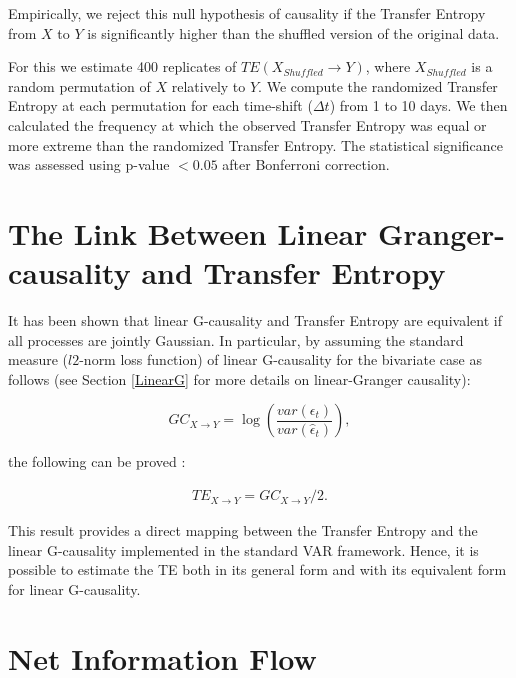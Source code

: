 \documentclass[]{book}
\theoremstyle{definition}
\theoremstyle{definition}
\theoremstyle{definition}
\theoremstyle{remark}
\begin{document}
Empirically, we reject this null hypothesis of causality if the Transfer
Entropy from \(X\) to \(Y\) is significantly higher than the shuffled
version of the original data.

For this we estimate 400 replicates of
\(TE(X_{Shuffled} \rightarrow Y)\), where \(X_{Shuffled}\) is a random
permutation of \(X\) relatively to \(Y\). We compute the randomized
Transfer Entropy at each permutation for each time-shift (\(\Delta t\))
from 1 to 10 days. We then calculated the frequency at which the
observed Transfer Entropy was equal or more extreme than the randomized
Transfer Entropy. The statistical significance was assessed using
p-value \(< 0.05\) after Bonferroni correction.

\section{The Link Between Linear Granger-causality and Transfer
Entropy}\label{the-link-between-linear-granger-causality-and-transfer-entropy}

It has been shown \citep{PhysRevLett.103.238701} that linear G-causality
and Transfer Entropy are equivalent if all processes are jointly
Gaussian. In particular, by assuming the standard measure (\(l2\)-norm
loss function) of linear G-causality for the bivariate case as follows
(see Section \ref{LinearG} for more details on linear-Granger
causality):

\begin{equation}
GC_{X \rightarrow Y} = \log\left( \frac{var(\epsilon_t)}{var( \widehat{\epsilon}_t)} \right),
\label{eq:GCGC}
\end{equation}

the following can be proved \citep{PhysRevLett.103.238701}:

\begin{align}
TE_{X \rightarrow Y} = GC_{X \rightarrow Y}/2.
\label{eq:GCGC2}
\end{align}

This result provides a direct mapping between the Transfer Entropy and
the linear G-causality implemented in the standard VAR framework. Hence,
it is possible to estimate the TE both in its general form and with its
equivalent form for linear G-causality.

\section{Net Information Flow}\label{net-information-flow}
\end{document}
